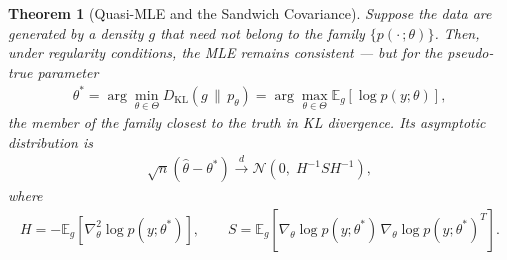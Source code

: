 \documentclass[11pt]{article}
\theoremstyle{definition}
\theoremstyle{plain}
\newtheorem{theorem}{Theorem}[section]
\theoremstyle{remark}
\begin{document}
\begin{theorem}[Quasi-MLE and the Sandwich Covariance]
    Suppose the data are generated by a density $g$ that need \emph{not} belong to the family $\{p(\cdot\,;\theta)\}$. Then, under regularity conditions, the MLE remains consistent --- but for the \emph{pseudo-true} parameter
    \begin{align}
        \theta^* = \arg\min_{\theta\in\Theta} D_{\mathrm{KL}}\!\left(g \,\|\, p_\theta\right) = \arg\max_{\theta\in\Theta}\mathbb{E}_g[\log p(y;\theta)],
    \end{align}
    the member of the family closest to the truth in KL divergence. Its asymptotic distribution is
    \begin{align}
        \sqrt{n}(\hat{\theta} - \theta^*) \xrightarrow{d} \mathcal{N}\!\left(0,\; H^{-1} S H^{-1}\right),
    \end{align}
    where
    \begin{align}
        H = -\mathbb{E}_g\!\left[\nabla^2_\theta \log p(y;\theta^*)\right], \qquad
        S = \mathbb{E}_g\!\left[\nabla_\theta \log p(y;\theta^*)\,\nabla_\theta \log p(y;\theta^*)^T\right].
    \end{align}
\end{theorem}
\end{document}
